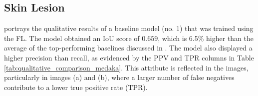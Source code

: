 \subsection{Skin Lesion}

 portrays the qualitative results of a baseline model (no. 1) that was trained using the \ac{FL}. The model obtained an \ac{IoU} score of $0.659$, which is 6.5\% higher than the average of the top-performing baselines discussed in . The model also displayed a higher precision than recall, as evidenced by the PPV and TPR columns in Table \ref{tab:qualitative_comparison_medaka}. This attribute is reflected in the images, particularly in images (a) and (b), where a larger number of false negatives contribute to a lower true positive rate (TPR).
\begin{figure}[H]%
  \centering  

\end{figure}
